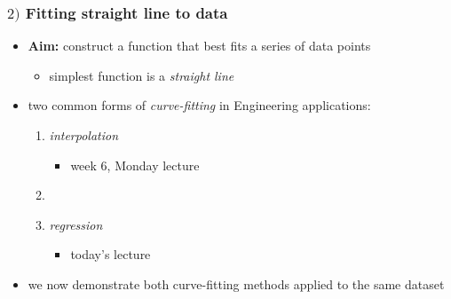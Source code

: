 \documentclass[english,14pt]{beamer}
\newcommand\red[1]{{\color{red} #1}}
\begin{document}
\begin{frame}[fragile]

\frametitle{$2)$ Fitting straight line to data}

\begin{itemize}
	\item \textbf{Aim:} construct a function that best fits a series of data points
	\begin{itemize}
		\item simplest function is a \emph{straight line}
	\end{itemize}
	\item two common forms of \red{\emph{curve-fitting}} in Engineering applications:
	
	\begin{enumerate}
	\item \red{\emph{interpolation}}
	\begin{itemize}
		\item week 6, Monday lecture
	\end{itemize}
	\item[]
	\item \red{\emph{regression}}
	\begin{itemize}
		\item today's lecture
	\end{itemize}
\end{enumerate}

\end{itemize}
	
\begin{itemize}
	\item we now demonstrate both curve-fitting methods applied to the same dataset
\end{itemize}

\end{frame}

\end{document}
